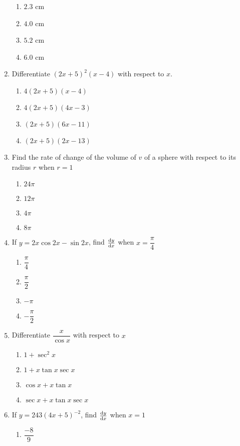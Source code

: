 \begin{multicols}{2}
\begin{enumerate}[label={\arabic*.}]
	\begin{enumerate}[label={\Alph*.}]
	\item \(2.3\) cm
	\item \(4.0\) cm
	\item \(5.2\) cm
	\item \(6.0\) cm
	\end{enumerate}
\item Differentiate \((2x+5)^{2}(x-4)\) with respect to \(x\).
	\begin{enumerate}[label={\Alph*.}]
	\item \(4(2x+5)(x-4)\)
	\item \(4(2x+5)(4x-3)\)
	\item \((2x+5)(6x-11)\)
	\item \((2x+5)(2x-13)\)
	\end{enumerate}
\item Find the rate of change of the volume of \(v\) of a sphere with respect to its radius \(r\) when \(r = 1\)
	\begin{enumerate}[label={\Alph*.}]
	\item \(24\pi\)
	\item \(12\pi\)
	\item \(4\pi\)
	\item \(8\pi\)
	\end{enumerate}
\item If \(y = 2x\cos{2x}-\sin{2x}\), find \(\dv{y}{x}\) when \(x = \dfrac{\pi}{4}\)
	\begin{enumerate}[label={\Alph*.}]
	\item \(\dfrac{\pi}{4}\)
	\item \(\dfrac{\pi}{2}\)
	\item \(-\pi\)
	\item \(-{\dfrac{\pi}{2}}\)
	\end{enumerate}
\item Differentiate \(\dfrac{x}{\cos x}\) with respect to \(x\)
	\begin{enumerate}[label={\Alph*.}]
	\item \(1 + \sec^{2}x\)
	\item \(1 + x\tan x\sec x\)
	\item \(\cos x + x\tan x \)
	\item \(\sec x + x\tan x \sec x\)
	\end{enumerate}
\item If \(y = 243{(4x+5)}^{-2}\), find \(\dv{y}{x}\) when \(x = 1\)
	\begin{enumerate}[label={\Alph*.}]
	\item \(\dfrac{-8}{9}\)

\end{enumerate}
\end{enumerate}
\end{multicols}
